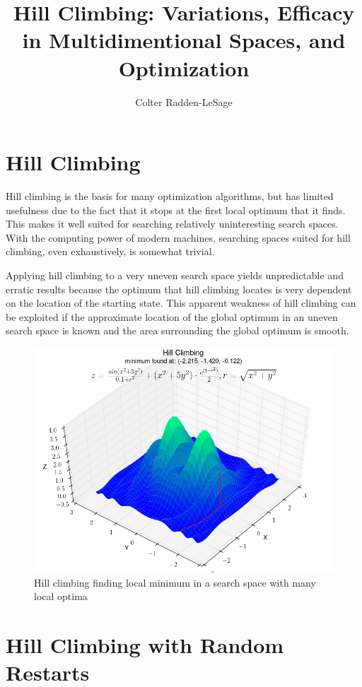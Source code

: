 \documentclass[10pt,a4paper,titlepage]{article}
\author{Colter Radden-LeSage}
\title{Hill Climbing: Variations, Efficacy in Multidimentional Spaces, and Optimization}
\begin{document}
\maketitle
\section{Hill Climbing}

	Hill climbing is the basis for many optimization algorithms, but has limited usefulness due to the fact that it stops at the first local optimum that it finds.  This makes it well suited for searching relatively uninteresting search spaces. With the computing power of modern machines, searching spaces suited for hill climbing, even exhaustively, is somewhat trivial.
	
	Applying hill climbing to a very uneven search space yields unpredictable and erratic results because the optimum that hill climbing locates is very dependent on the location of the starting state.  This apparent weakness of hill climbing can be exploited if the approximate location of the global optimum in an uneven search space is known and the area surrounding the global optimum is smooth.
	
\begin{figure}[!ht]
  \centering
    \includegraphics[width=\textwidth]{hill_climbing.png}
    \caption{Hill climbing finding local minimum in a search space with many local optima}
\end{figure}

\newpage
\section{Hill Climbing with Random Restarts}
\end{document}
